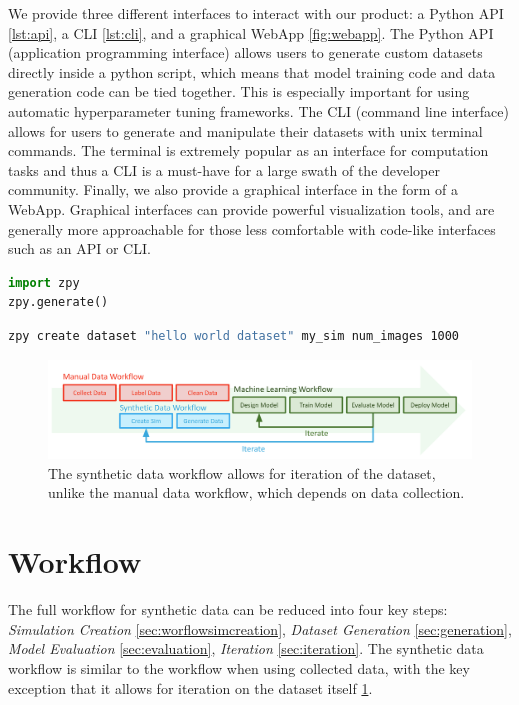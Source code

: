 \documentclass{article}
\begin{document}
We provide three different interfaces to interact with our product: a Python API \ref{lst:api}, a CLI \ref{lst:cli}, and a graphical WebApp \ref{fig:webapp}. The Python API (application programming interface) allows users to generate custom datasets directly inside a python script, which means that model training code and data generation code can be tied together. This is especially important for using automatic hyperparameter tuning frameworks. The CLI (command line interface) allows for users to generate and manipulate their datasets with unix terminal commands. The terminal is extremely popular as an interface for computation tasks and thus a CLI is a must-have for a large swath of the developer community. Finally, we also provide a graphical interface in the form of a WebApp. Graphical interfaces can provide powerful visualization tools, and are generally more approachable for those less comfortable with code-like interfaces such as an API or CLI. 

\begin{lstlisting}[language=Python,caption={Generating a dataset using the zpy python API.},label={lst:api}]
import zpy
zpy.generate()
\end{lstlisting}

\begin{lstlisting}[language=bash,caption={Generating a dataset using the zpy CLI},label={lst:cli}]
zpy create dataset "hello world dataset" my_sim num_images 1000
\end{lstlisting}

\begin{figure}
	\centering
	\includegraphics[width=\textwidth]{workflow.png}
	\caption{The synthetic data workflow allows for iteration of the dataset, unlike the manual data workflow, which depends on data collection.}
	\label{fig:workflow}
\end{figure}

\section{Workflow}
\label{sec:workflow}

The full workflow for synthetic data can be reduced into four key steps: \emph{Simulation Creation} \ref{sec:worflowsimcreation}, \emph{Dataset Generation} \ref{sec:generation}, \emph{Model Evaluation} \ref{sec:evaluation}, \emph{Iteration} \ref{sec:iteration}. The synthetic data workflow is similar to the workflow when using collected data, with the key exception that it allows for iteration on the dataset itself \ref{fig:workflow}.
\end{document}
